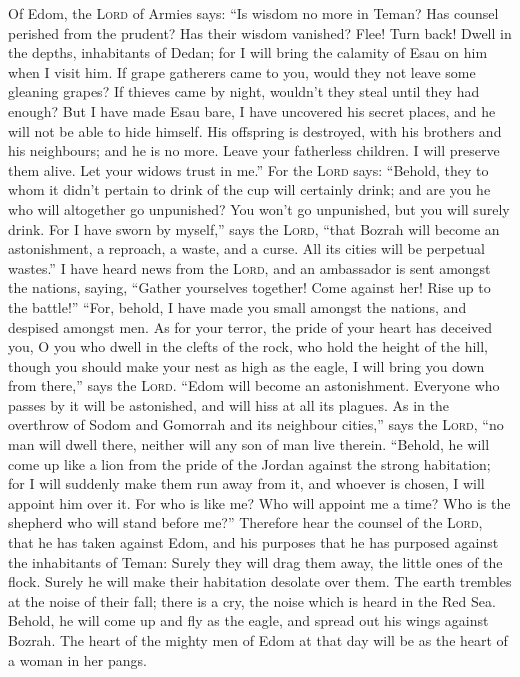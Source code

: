  Of Edom, the \textsc{Lord} of Armies says: ``Is wisdom no
more in Teman? Has counsel perished from the prudent? Has their wisdom
vanished?  Flee! Turn back! Dwell in the depths,
inhabitants of Dedan; for I will bring the calamity of Esau on him when
I visit him.  If grape gatherers came to you, would they
not leave some gleaning grapes? If thieves came by night, wouldn't they
steal until they had enough?  But I have made Esau bare,
I have uncovered his secret places, and he will not be able to hide
himself. His offspring is destroyed, with his brothers and his
neighbours; and he is no more.  Leave your fatherless
children. I will preserve them alive. Let your widows trust in me.''
 For the \textsc{Lord} says: ``Behold, they to whom it
didn't pertain to drink of the cup will certainly drink; and are you he
who will altogether go unpunished? You won't go unpunished, but you will
surely drink.  For I have sworn by myself,'' says the
\textsc{Lord}, ``that Bozrah will become an astonishment, a reproach, a
waste, and a curse. All its cities will be perpetual wastes.''
 I have heard news from the \textsc{Lord}, and an
ambassador is sent amongst the nations, saying, ``Gather yourselves
together! Come against her! Rise up to the battle!'' 
``For, behold, I have made you small amongst the nations, and despised
amongst men.  As for your terror, the pride of your heart
has deceived you, O you who dwell in the clefts of the rock, who hold
the height of the hill, though you should make your nest as high as the
eagle, I will bring you down from there,'' says the \textsc{Lord}.
 ``Edom will become an astonishment. Everyone who passes
by it will be astonished, and will hiss at all its plagues.
 As in the overthrow of Sodom and Gomorrah and its
neighbour cities,'' says the \textsc{Lord}, ``no man will dwell there,
neither will any son of man live therein.  ``Behold, he
will come up like a lion from the pride of the Jordan against the strong
habitation; for I will suddenly make them run away from it, and whoever
is chosen, I will appoint him over it. For who is like me? Who will
appoint me a time? Who is the shepherd who will stand before me?''
 Therefore hear the counsel of the \textsc{Lord}, that he
has taken against Edom, and his purposes that he has purposed against
the inhabitants of Teman: Surely they will drag them away, the little
ones of the flock. Surely he will make their habitation desolate over
them.  The earth trembles at the noise of their fall;
there is a cry, the noise which is heard in the Red Sea. 
Behold, he will come up and fly as the eagle, and spread out his wings
against Bozrah. The heart of the mighty men of Edom at that day will be
as the heart of a woman in her pangs.

